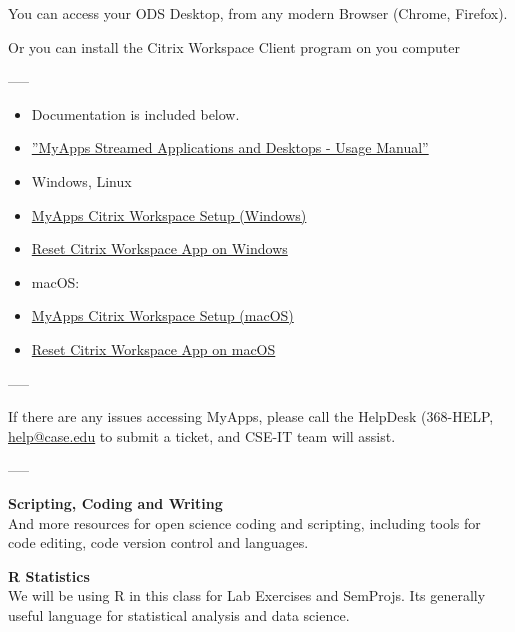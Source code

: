 \documentclass[10pt]{article} %
\begin{document}
    You can access your ODS Desktop, from any modern Browser (Chrome, Firefox).

    Or you can install the Citrix Workspace Client program on you computer

    -----


    \begin{itemize}
      \item     Documentation is included below.

      \item \href{https://drive.google.com/open?id=1FXUoD_p-pMnoPTO7DPsDSVFr9t8vQmp8y-7xxdvvIfw}{''MyApps Streamed Applications and Desktops - Usage Manual''}

      \item Windows, Linux

      \item \href{https://drive.google.com/open?id=1__lS_43YQ1-6exw0EsP3RKnOT3AJKAtR5oqLleT590g}{MyApps Citrix Workspace Setup (Windows)}

      \item \href{https://drive.google.com/open?id=1rzVb7ZFDjRVfc8Zjtn_F8jqbxD67gtDrvSnqUhVeQyI}{Reset Citrix Workspace App on Windows}

      \item macOS:

      \item \href{https://drive.google.com/open?id=1v2O91Zf4rmSo2Qoxq_l3JVQNPaFPrllSDxZB8CYSnz8}{MyApps Citrix Workspace Setup (macOS)}

      \item \href{https://drive.google.com/open?id=1rzVb7ZFDjRVfc8Zjtn_F8jqbxD67gtDrvSnqUhVeQyI}{Reset Citrix Workspace App on macOS}
    \end{itemize}


    -----

    If there are any issues accessing MyApps, please call the HelpDesk (368-HELP, \href{mailto:help@case.edu}{help@case.edu} to submit a ticket, and CSE-IT team will assist.

    -----

    {\bf Scripting, Coding and Writing} \\
    And more resources for open science coding and scripting, including tools for code editing, code version control and languages.

    {\bf R Statistics} \\
    We will be using R in this class for Lab Exercises and SemProjs.
    Its generally useful language for statistical analysis and data science.
\end{document}
